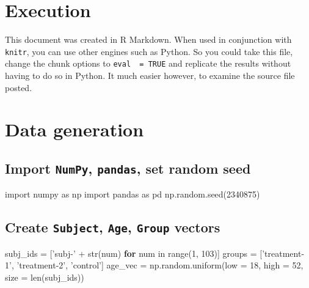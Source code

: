\documentclass[]{article}
\newenvironment{Shaded}{\begin{snugshade}}{\end{snugshade}}
\newcommand{\KeywordTok}[1]{\textcolor[rgb]{0.13,0.29,0.53}{\textbf{{#1}}}}
\newcommand{\DataTypeTok}[1]{\textcolor[rgb]{0.13,0.29,0.53}{{#1}}}
\newcommand{\DecValTok}[1]{\textcolor[rgb]{0.00,0.00,0.81}{{#1}}}
\newcommand{\CharTok}[1]{\textcolor[rgb]{0.31,0.60,0.02}{{#1}}}
\newcommand{\StringTok}[1]{\textcolor[rgb]{0.31,0.60,0.02}{{#1}}}
\newcommand{\NormalTok}[1]{{#1}}
\begin{document}
\section{Execution}\label{execution}

This document was created in R Markdown. When used in conjunction with
\texttt{knitr}, you can use other engines such as Python. So you could
take this file, change the chunk options to \texttt{eval\ \ =\ TRUE} and
replicate the results without having to do so in Python. It much easier
however, to examine the source file posted.

\section{Data generation}\label{data-generation}

\subsection{\texorpdfstring{Import \texttt{NumPy}, \texttt{pandas}, set
random
seed}{Import NumPy, pandas, set random seed}}\label{import-numpy-pandas-set-random-seed}

\begin{Shaded}
\begin{Highlighting}[]

\CharTok{import} \NormalTok{numpy }\CharTok{as} \NormalTok{np}
\CharTok{import} \NormalTok{pandas }\CharTok{as} \NormalTok{pd}
\NormalTok{np.random.seed(}\DecValTok{2340875}\NormalTok{)}
\end{Highlighting}
\end{Shaded}

\subsection{\texorpdfstring{Create \texttt{Subject}, \texttt{Age},
\texttt{Group}
vectors}{Create Subject, Age, Group vectors}}\label{create-subject-age-group-vectors}

\begin{Shaded}
\begin{Highlighting}[]

\NormalTok{subj_ids = [}\StringTok{'subj-'} \NormalTok{+ }\DataTypeTok{str}\NormalTok{(num) }\KeywordTok{for} \NormalTok{num in }\DataTypeTok{range}\NormalTok{(}\DecValTok{1}\NormalTok{, }\DecValTok{103}\NormalTok{)]}
\NormalTok{groups = [}\StringTok{'treatment-1'}\NormalTok{, }\StringTok{'treatment-2'}\NormalTok{, }\StringTok{'control'}\NormalTok{]}
\NormalTok{age_vec = np.random.uniform(low = }\DecValTok{18}\NormalTok{, high = }\DecValTok{52}\NormalTok{, size = }\DataTypeTok{len}\NormalTok{(subj_ids))}
\end{Highlighting}
\end{Shaded}
\end{document}
